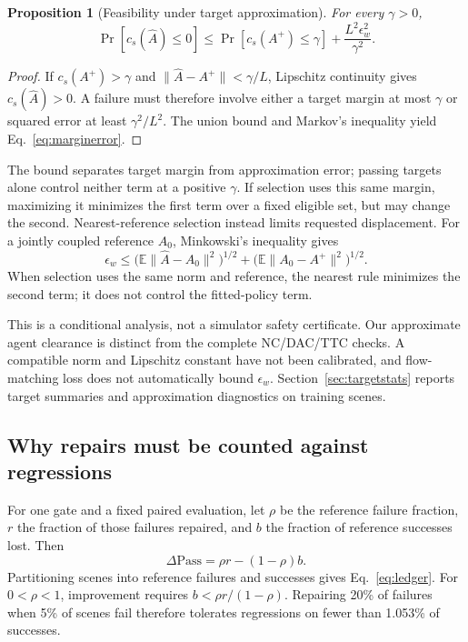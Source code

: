 \documentclass[letterpaper,10pt,conference]{ieeeconf}
\newtheorem{proposition}{Proposition}
\newcommand{\E}{\mathbb{E}}
\begin{document}
\begin{proposition}[Feasibility under target approximation]\label{prop:margin}
For every $\gamma>0$,
\begin{equation}
\Pr[c_s(\widehat A)\leq0]
\leq\Pr[c_s(A^+)\leq\gamma]+\frac{L^2\epsilon_w^2}{\gamma^2}.
\label{eq:marginerror}
\end{equation}
\end{proposition}
\begin{proof}
If $c_s(A^+)>\gamma$ and $\|\widehat A-A^+\|<\gamma/L$, Lipschitz continuity gives $c_s(\widehat A)>0$. A failure must therefore involve either a target margin at most $\gamma$ or squared error at least $\gamma^2/L^2$. The union bound and Markov's inequality yield Eq.~\eqref{eq:marginerror}.
\end{proof}

The bound separates target margin from approximation error; passing targets alone control neither term at a positive $\gamma$. If selection uses this same margin, maximizing it minimizes the first term over a fixed eligible set, but may change the second. Nearest-reference selection instead limits requested displacement. For a jointly coupled reference $A_0$, Minkowski's inequality gives
\begin{equation}
\epsilon_w\leq
\big(\E\|\widehat A-A_0\|^2\big)^{1/2}
+\big(\E\|A_0-A^+\|^2\big)^{1/2}.
\label{eq:displacement}
\end{equation}
When selection uses the same norm and reference, the nearest rule minimizes the second term; it does not control the fitted-policy term.

This is a conditional analysis, not a simulator safety certificate. Our approximate agent clearance is distinct from the complete NC/DAC/TTC checks. A compatible norm and Lipschitz constant have not been calibrated, and flow-matching loss does not automatically bound $\epsilon_w$. Section~\ref{sec:targetstats} reports target summaries and approximation diagnostics on training scenes.

\subsection{Why repairs must be counted against regressions}
For one gate and a fixed paired evaluation, let $\rho$ be the reference failure fraction, $r$ the fraction of those failures repaired, and $b$ the fraction of reference successes lost. Then
\begin{equation}
\Delta\mathrm{Pass}=\rho r-(1-\rho)b.\label{eq:ledger}
\end{equation}
Partitioning scenes into reference failures and successes gives Eq.~\eqref{eq:ledger}. For $0<\rho<1$, improvement requires $b<\rho r/(1-\rho)$. Repairing 20\% of failures when 5\% of scenes fail therefore tolerates regressions on fewer than 1.053\% of successes.
\end{document}
